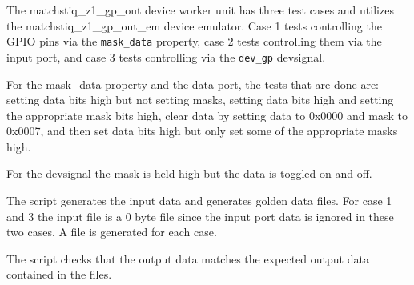 \begin{flushleft}

The matchstiq\_z1\_gp\_out device worker unit has three test cases and utilizes the matchstiq\_z1\_gp\_out\_em device emulator. Case 1 tests controlling the GPIO pins via the \texttt{mask\_data} property, case 2 tests controlling them via the input port, and case 3 tests controlling via the \texttt{dev\_gp} devsignal. \newline

For the mask\_data property and the data port, the tests that are done are: setting data bits high but not setting masks, setting data bits high and setting the appropriate mask bits high, clear data by setting data to 0x0000 and mask to 0x0007,
and then set data bits high but only set some of the appropriate masks high.\newline

For the devsignal the mask is held high but the data is toggled on and off. \newline
  
The  script generates the input data and generates golden data files. For case 1 and 3 the input file is a 0 byte file since the input port data is ignored in these two cases. A  file is generated for each case. \newline

The  script checks that the output data matches the expected output data contained in the  files.

\end{flushleft}

